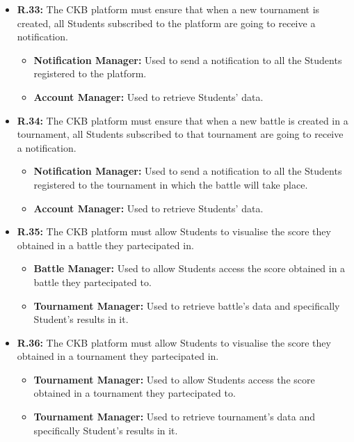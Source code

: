 \documentclass{article}
\begin{document}
{\begin{itemize}
\begin{itemize}
          \end{itemize}
    \item \textbf{R.33:} The CKB platform must ensure that when a new tournament is created, all
          Students subscribed to the platform are going to receive a notification.
          \begin{itemize}
              \item \textbf{Notification Manager:} Used to send a notification to all the Students
              registered to the platform.
              \item \textbf{Account Manager:} Used to retrieve Students' data.
          \end{itemize}
    \item \textbf{R.34:} The CKB platform must ensure that when a new battle is created in a tournament,
          all Students subscribed to that tournament are going to receive a notification.
          \begin{itemize}
              \item \textbf{Notification Manager:} Used to send a notification to all the Students
              registered to the tournament in which the battle will take place.
              \item \textbf{Account Manager:} Used to retrieve Students' data.
          \end{itemize}
    \item \textbf{R.35:} The CKB platform must allow Students to visualise the score they obtained in a battle they partecipated in.
          \begin{itemize}
              \item \textbf{Battle Manager:} Used to allow Students access the score obtained
              in a battle they partecipated to.
              \item \textbf{Tournament Manager:} Used to retrieve battle's data and specifically
              Student's results in it.
          \end{itemize}
    \item \textbf{R.36:} The CKB platform must allow Students to visualise the score they obtained in a tournament they partecipated in.
          \begin{itemize}
            \item \textbf{Tournament Manager:} Used to allow Students access the score obtained
            in a tournament they partecipated to.
            \item \textbf{Tournament Manager:} Used to retrieve tournament's data and specifically Student's results in it.

\end{itemize}
\end{itemize}}
\end{document}
